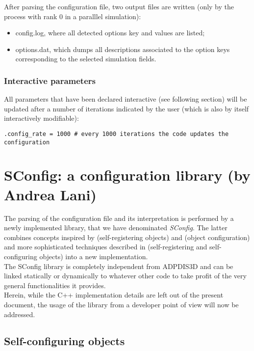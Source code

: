 \documentclass[11pt]{article}
\begin{document}
After parsing the configuration file, two output files are written 
(only by the process with rank 0 in a paralllel simulation):
\begin{itemize}
\item
  config.log, where all detected options key and values are listed; 
\item
  options.dat, which dumps all descriptions associated to the
  option keys corresponding to the selected simulation fields.
\end{itemize}

\subsubsection{Interactive parameters}

All parameters that have been declared interactive (see
following section) will be updated after a number of iterations
indicated by the user (which is also by itself interactively modifiable):
\vspace{-0.2cm}
\begin{verbatim}
.config_rate = 1000 # every 1000 iterations the code updates the configuration
\end{verbatim}

\newpage
\section{SConfig: a configuration library (by Andrea Lani)}\label{ssec:sconfig}

The parsing of the configuration file and its interpretation is
performed by a newly implemented library, that we have denominated
\textit{SConfig}. The latter combines concepts inspired by 
\cite{Beveridge} (self-registering objects) and \cite{Yagol} 
(object configuration) and more sophisticated techniques 
described in \cite{Quintino08, Lani08} (self-registering
and self-configuring objects) into a new implementation. \\
The SConfig library is completely independent from ADPDIS3D 
and can be linked statically or dynamically to whatever other code to
take profit of the very general functionalities it provides.\\
Herein, while the C++ implementation details are left out of the present document,
the usage of the library from a developer point of view will now be 
addressed.

\subsection{Self-configuring objects}\label{ssec:self-configuration}
\end{document}
